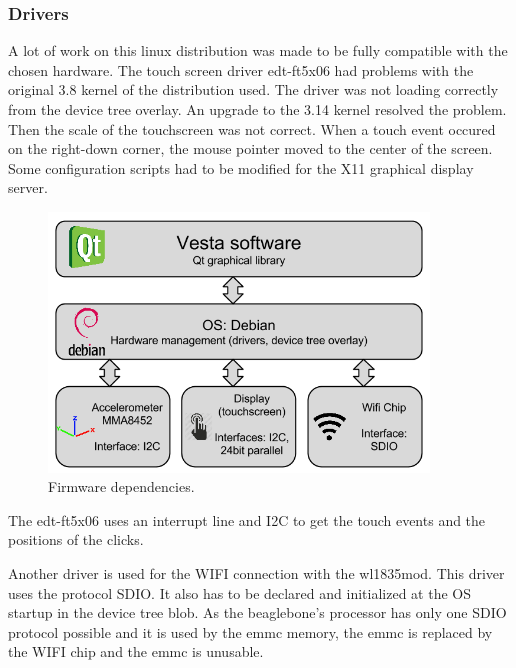 \subsubsection{Drivers}
A lot of work on this linux distribution was made to be fully compatible with the chosen hardware.
The touch screen driver edt-ft5x06 had problems with the original 3.8 kernel of the distribution used. The driver was not loading correctly from the device tree overlay. An upgrade to the 3.14 kernel resolved the problem.
Then the scale of the touchscreen was not correct. 
When a touch event occured on the right-down corner, the mouse pointer moved to the center of the screen. Some configuration scripts had to be modified for the X11 graphical display server.

\begin{figure}[!htb]
    \centering
    \includegraphics[width=0.9\textwidth,keepaspectratio]{chap/softFig/first_diagram2}
    \caption{Firmware dependencies.}
    \label{fig:firmware dependencies}
\end{figure}

The edt-ft5x06 uses an interrupt line and I2C to get the touch events and the positions of the clicks.

Another driver is used for the WIFI connection with the wl1835mod. This driver uses the protocol SDIO. It also has to be declared and initialized at the OS startup in the device tree blob. As the beaglebone's processor has only one SDIO protocol possible and it is used by the emmc memory, the emmc is replaced by the WIFI chip and the emmc is unusable.

